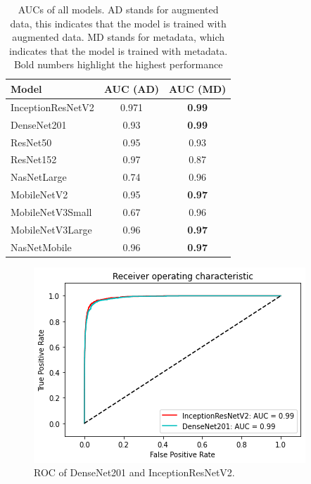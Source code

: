 \documentclass[sensors,article,accept,pdftex,moreauthors]{Definitions/mdpi}
\begin{document}
	\begin{table}[H]
			\caption{AUCs of all models. AD stands for augmented data, this indicates that the model is trained with augmented data. MD stands for metadata, which indicates that the model is trained with metadata. Bold numbers highlight the highest performance}
		\label{table:overall-auc}
	\setlength{\tabcolsep}{12.3mm}\begin{tabular}{ l  c  c  }
\toprule
\textbf{Model} & \textbf{AUC (AD)} & \textbf{AUC (MD)}\\ 
\midrule
InceptionResNetV2 & 0.971 & \textbf{{0.99} %
}\\
\midrule
DenseNet201 & 0.93 & \textbf{0.99}\\
\midrule
ResNet50 & 0.95 & 0.93 \\
\midrule
ResNet152 & 0.97 & 0.87\\
\midrule
NasNetLarge & 0.74 & 0.96\\
\midrule
MobileNetV2 & 0.95 & \textbf{0.97}\\
\midrule
MobileNetV3Small & 0.67 & 0.96\\
\midrule
MobileNetV3Large & 0.96 & \textbf{0.97}\\
\midrule
NasNetMobile & 0.96 & \textbf{0.97}\\
\bottomrule
		\end{tabular}
	\end{table}\unskip
	
	\begin{figure}[H]
		\centering
		\includegraphics[width=1\linewidth]{Definitions/ROC/denvsirv2}
		\caption{ROC of DenseNet201 and InceptionResNetV2.}\label{fig:densevsirv2}
	\end{figure}
			
\end{document}
